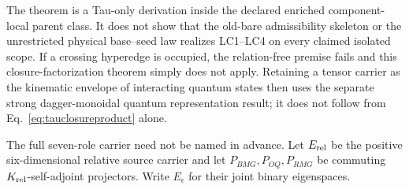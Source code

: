 The theorem is a Tau-only derivation inside the declared enriched
component-local parent class.  It does not show that the old-bare
admissibility skeleton or the unrestricted physical base--seed law realizes
LC1--LC4 on every claimed isolated scope.  If a crossing hyperedge is
occupied, the relation-free premise fails and this closure-factorization
theorem simply does not apply.  Retaining a tensor carrier as the kinematic
envelope of interacting quantum states then uses the separate strong
dagger-monoidal quantum representation result; it does not follow from
Eq.~\eqref{eq:tauclosureproduct} alone.

The full seven-role carrier need not be named in advance.  Let
$E_{\rm rel}$ be the positive six-dimensional relative source carrier and let
$P_{BMG},P_{OQ},P_{RMG}$ be commuting $K_{\rm rel}$-self-adjoint
projectors.  Write $E_{\epsilon}$ for their joint binary eigenspaces.

